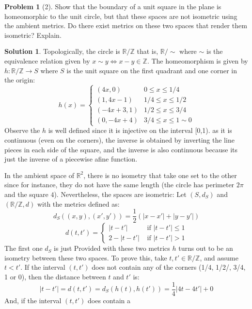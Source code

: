 \documentclass{article}
\theoremstyle{definition}
\newtheorem*{soln}{Solution}
\newtheorem*{prob}{Problem}
\theoremstyle{theorem}
\newcommand{\R}{\mathbb{R}}
\newcommand{\Z}{\mathbb{Z}}
\begin{document}
\begin{prob}[2]
Show that the boundary of a unit square in the plane is homeomorphic to the unit circle, but that these spaces are not isometric using the ambient metrics.  Do there exist metrics on these two spaces that render them isometric?  Explain.
\end{prob}
\begin{soln}
    Topologically, the circle is $\R/\Z$ that is, $\R/\sim$ where $\sim$ is the equivalence relation given by $x\sim y \iff x-y \in \Z$. The homeomorphism is given by $h:\R/\Z \to S$ where $S$ is the unit square on the first quadrant and one corner in the origin:
    $$h(x) = \begin{cases}
        (4x,0) & 0\leq x\leq 1/4 \\
        (1, 4x-1) & 1/4\leq x \leq 1/2\\
        (-4x+3, 1) & 1/2 \leq x\leq 3/4\\
        (0,-4x+4) & 3/4 \leq x\leq 1\sim 0 
    \end{cases}$$
    Observe the $h$ is well defined since it is injective on the interval [0,1). as it is continuous (even on the corners), the inverse is obtained by inverting the line pieces in each side of the square, and the inverse is also continuous because its just the inverse of a piecewise afine function.

    In the ambient space of $\R^2$, there is no isometry that take one set to the other since  for instance, they do not have the same length (the circle has perimeter $2\pi$ and the square $4$). Nevertheless, the spaces are isometric: Let $(S,d_S)$ and $(\R/\Z, d)$ with the metrics defined as:
    $$d_S ((x,y),(x',y')) = \frac 12 (|x-x'| + |y-y'|)$$
    $$d(t,t') = \begin{cases}
        |t-t'| & \text{ if } |t-t'| \leq 1  \\
        2- |t-t'| & \text { if } |t-t'| > 1
    \end{cases}$$
The first one $d_S$ is just 
    Provided with these two metrics $h$ turns out to be an isometry between these two spaces. To prove this, take $t, t'\in \R/\Z$, and assume $t<t'$. If the interval $(t,t')$ does not contain any of the corners (1/4, 1/2/, 3/4, 1 or 0), then the distance between $t$ and $t'$ is:
    $$|t-t'| = d(t,t') = d_S(h(t), h(t')) = \frac 14 |4t - 4t'| + 0$$
    And, if the interval $(t,t')$ does contain a 
\end{soln}
\vspace{1in}
\end{document}

